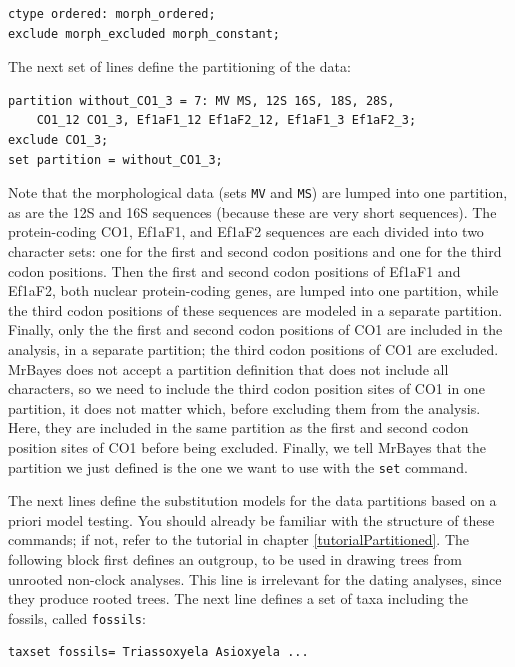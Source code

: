 \documentclass[12pt]{book}
\begin{document}
\begin{Verbatim}
ctype ordered: morph_ordered;
exclude morph_excluded morph_constant;
\end{Verbatim}

The next set of lines define the partitioning of the data:

\begin{Verbatim}
partition without_CO1_3 = 7: MV MS, 12S 16S, 18S, 28S,
    CO1_12 CO1_3, Ef1aF1_12 Ef1aF2_12, Ef1aF1_3 Ef1aF2_3;
exclude CO1_3;
set partition = without_CO1_3;
\end{Verbatim}

Note that the morphological data (sets \texttt{MV} and \texttt{MS}) are lumped into one partition,
as are the 12S and 16S sequences (because these are very short sequences). The protein-coding CO1,
Ef1aF1, and Ef1aF2 sequences are each divided into two character sets: one for the first and second
codon positions and one for the third codon positions. Then the first and second codon positions of
Ef1aF1 and Ef1aF2, both nuclear protein-coding genes, are lumped into one partition, while the
third codon positions of these sequences are modeled in a separate partition. Finally, only the the
first and second codon positions of CO1 are included in the analysis, in a separate partition; the
third codon positions of CO1 are excluded. MrBayes does not accept a partition definition that does
not include all characters, so we need to include the third codon position sites of CO1 in one
partition, it does not matter which, before excluding them from the analysis. Here, they are
included in the same partition as the first and second codon position sites of CO1 before being
excluded. Finally, we tell MrBayes that the partition we just defined is the one we want to use
with the \texttt{set} command.

The next lines define the substitution models for the data partitions based on a priori model
testing. You should already be familiar with the structure of these commands; if not, refer to the
tutorial in chapter \ref{tutorialPartitioned}. The following block first defines an outgroup, to be
used in drawing trees from unrooted non-clock analyses. This line is irrelevant for the dating
analyses, since they produce rooted trees. The next line defines a set of taxa including the
fossils, called \texttt{fossils}:

\begin{Verbatim}
taxset fossils= Triassoxyela Asioxyela ...
\end{Verbatim}
\end{document}
